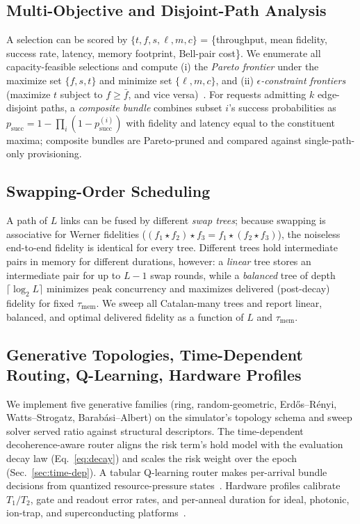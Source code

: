 \documentclass[10pt,a4paper]{article}
\begin{document}
\subsection{Multi-Objective and Disjoint-Path Analysis}
\label{sec:multiobj}

A selection can be scored by
$\{t,f,s,\ell,m,c\}$ = \{throughput, mean fidelity, success rate,
latency, memory footprint, Bell-pair cost\}.  We enumerate all
capacity-feasible selections and compute (i) the \emph{Pareto frontier}
under the maximize set $\{f,s,t\}$ and minimize set $\{\ell,m,c\}$, and
(ii) \emph{$\epsilon$-constraint frontiers} (maximize $t$ subject to
$f \ge \bar f$, and vice versa)~\cite{deb2001multiobjective}.  For
requests admitting $k$ edge-disjoint paths, a \emph{composite bundle}
combines subset $i$'s success probabilities as
$p_{\text{succ}} = 1 - \prod_i (1 - p_{\text{succ}}^{(i)})$ with
fidelity and latency equal to the constituent maxima; composite
bundles are Pareto-pruned and compared against single-path-only
provisioning.

\subsection{Swapping-Order Scheduling}
\label{sec:swapping}

A path of $L$ links can be fused by different \emph{swap trees};
because swapping is associative for Werner fidelities
($(f_1 \star f_2) \star f_3 = f_1 \star (f_2 \star f_3)$), the
noiseless end-to-end fidelity is identical for every tree.  Different
trees hold intermediate pairs in memory for different durations,
however: a \emph{linear} tree stores an intermediate pair for up to
$L-1$ swap rounds, while a \emph{balanced} tree of depth
$\lceil\log_2 L\rceil$ minimizes peak concurrency and maximizes
delivered (post-decay) fidelity for fixed $\tau_{\text{mem}}$.  We
sweep all Catalan-many trees and report linear, balanced, and optimal
delivered fidelity as a function of $L$ and $\tau_{\text{mem}}$.

\subsection{Generative Topologies, Time-Dependent Routing,
Q-Learning, Hardware Profiles}
\label{sec:extras}

We implement five generative families (ring, random-geometric,
Erd\H{o}s--R\'enyi, Watts--Strogatz, Barab\'asi--Albert) on the
simulator's topology schema and sweep solver served ratio against
structural descriptors.  The time-dependent decoherence-aware router
aligns the risk term's hold model with the evaluation decay law
(Eq.~\eqref{eq:decay}) and scales the risk weight over the epoch
(Sec.~\ref{sec:time-dep}).  A tabular Q-learning router makes
per-arrival bundle decisions from quantized resource-pressure
states~\cite{li2025qlearning,boyan1993packet}.  Hardware profiles
calibrate $T_1/T_2$, gate and readout error rates, and per-anneal
duration for ideal, photonic, ion-trap, and superconducting
platforms~\cite{lvovsky2009optical}.
\end{document}
